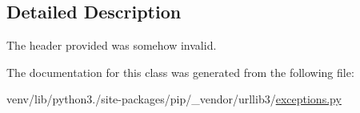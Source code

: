 \subsection{Detailed Description}
\begin{DoxyVerb}The header provided was somehow invalid.\end{DoxyVerb}
 

The documentation for this class was generated from the following file\+:\begin{DoxyCompactItemize}
\item 
venv/lib/python3./site-\/packages/pip/\+\_\+vendor/urllib3/\hyperlink{pip_2__vendor_2urllib3_2exceptions_8py}{exceptions.\+py}\end{DoxyCompactItemize}

